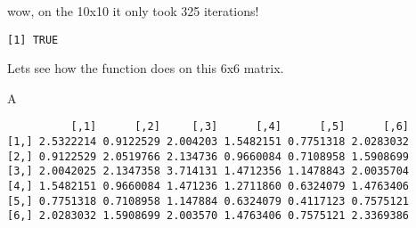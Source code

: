 \documentclass[]{article}
\newenvironment{Shaded}{\begin{snugshade}}{\end{snugshade}}
\newcommand{\KeywordTok}[1]{\textcolor[rgb]{0.13,0.29,0.53}{\textbf{#1}}}
\newcommand{\DataTypeTok}[1]{\textcolor[rgb]{0.13,0.29,0.53}{#1}}
\newcommand{\DecValTok}[1]{\textcolor[rgb]{0.00,0.00,0.81}{#1}}
\newcommand{\FloatTok}[1]{\textcolor[rgb]{0.00,0.00,0.81}{#1}}
\newcommand{\StringTok}[1]{\textcolor[rgb]{0.31,0.60,0.02}{#1}}
\newcommand{\CommentTok}[1]{\textcolor[rgb]{0.56,0.35,0.01}{\textit{#1}}}
\newcommand{\OperatorTok}[1]{\textcolor[rgb]{0.81,0.36,0.00}{\textbf{#1}}}
\newcommand{\NormalTok}[1]{#1}
\begin{document}
wow, on the 10x10 it only took 325 iterations!

\begin{Shaded}
\end{Shaded}

\begin{verbatim}
[1] TRUE
\end{verbatim}

Lets see how the function does on this 6x6 matrix.

\begin{Shaded}
\begin{Highlighting}[]
\NormalTok{A}
\end{Highlighting}
\end{Shaded}

\begin{verbatim}
          [,1]      [,2]     [,3]      [,4]      [,5]      [,6]
[1,] 2.5322214 0.9122529 2.004203 1.5482151 0.7751318 2.0283032
[2,] 0.9122529 2.0519766 2.134736 0.9660084 0.7108958 1.5908699
[3,] 2.0042025 2.1347358 3.714131 1.4712356 1.1478843 2.0035704
[4,] 1.5482151 0.9660084 1.471236 1.2711860 0.6324079 1.4763406
[5,] 0.7751318 0.7108958 1.147884 0.6324079 0.4117123 0.7575121
[6,] 2.0283032 1.5908699 2.003570 1.4763406 0.7575121 2.3369386
\end{verbatim}
\end{document}
